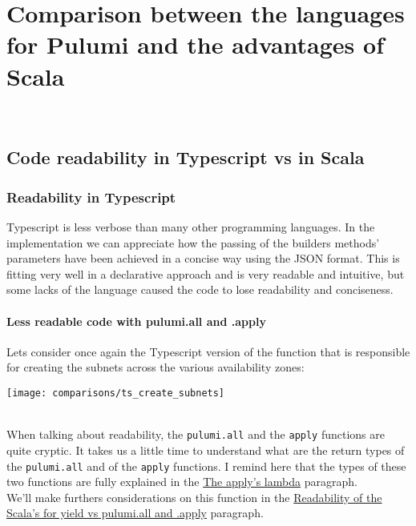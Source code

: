 
\chapter{Comparison between the languages for Pulumi and the advantages of Scala}
\label{cap:comparisons}

\\

\section{Code readability in Typescript vs in Scala}

\subsection{Readability in Typescript}
Typescript is less verbose than many other programming languages.
In the implementation we can appreciate how the passing of the builders methods' parameters have been achieved in a concise way using the JSON format.
This is fitting very well in a declarative approach and is very readable and intuitive, but some lacks of the language caused the code to lose readability and conciseness.

\subsubsection{Less readable code with pulumi.all and .apply}
\label{sssec:ts-subnets-comparison}
Lets consider once again the Typescript version of the function that is responsible for creating the subnets across the various availability zones:
\begin{center}
  \texttt{[image: comparisons/ts\_create\_subnets]} 
\end{center}\mbox{}\\
When talking about readability, the \texttt{pulumi.all} and the \texttt{apply} functions are quite cryptic.
It takes us a little time to understand what are the return types of the \texttt{pulumi.all} and of the \texttt{apply} functions.
I remind here that the types of these two functions are fully explained in the \hyperref[par:ts-lambda]{The apply's lambda} paragraph.\\
We'll make furthers considerations on this function in the \hyperref[sssec:readability-for-yield]{Readability of the Scala's for yield vs pulumi.all and .apply} paragraph.

